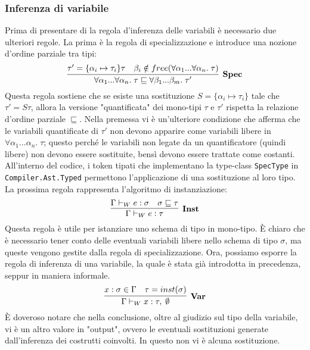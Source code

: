 \documentclass[10pt,a4paper]{article}
\begin{document}
\subsubsection{Inferenza di variabile}
Prima di presentare di la regola d'inferenza delle variabili è necessario due ulteriori regole. La prima è la
regola di specializzazione e introduce una nozione d'ordine parziale tra tipi:
\[ \infer[\textbf{Spec}]{\forall \alpha_1 ... \forall \alpha_n. \; \tau \sqsubseteq \forall \beta_1 ... \beta_m. \; \tau'}{\tau' = \{ \alpha_i \mapsto \tau_i \}\tau & \beta_i \notin free(\forall \alpha_1 ... \forall \alpha_n . \; \tau)} \]
Questa regola sostiene che se esiste una sostituzione $ S = \{ \alpha_i \mapsto \tau_i \} $ tale che $ \tau' = S \tau $,
allora la versione "quantificata" dei mono-tipi $ \tau $ e $ \tau' $ rispetta la relazione d'ordine parziale
$ \sqsubseteq $. Nella premessa vi è un'ulteriore condizione che afferma che le variabili quantificate di $ \tau' $
non devono apparire come variabili libere in $ \forall \alpha_1 ... \alpha_n. \; \tau $; questo perché le variabili
non legate da un quantificatore (quindi libere) non devono essere sostituite, bensì devono essere trattate come costanti.
All'interno del codice, i token tipati che implementano la type-class \texttt{SpecType} in \texttt{Compiler.Ast.Typed}
permettono l'applicazione di una sostituzione al loro tipo.
La prossima regola rappresenta l'algoritmo di instanziazione:
\[ \infer[\textbf{Inst}]{\Gamma \vdash_W e : \tau}{\Gamma \vdash_W e : \sigma & \sigma \sqsubseteq \tau} \]
Questa regola è utile per istanziare uno schema di tipo in mono-tipo. \`E chiaro che è necessario tener conto delle
eventuali variabili libere nello schema di tipo $ \sigma $, ma queste vengono gestite dalla regola di specializzazione.
Ora, possiamo esporre la regola di inferenza di una variabile, la quale è stata già introdotta in precedenza, seppur
in maniera informale.
\[ \infer[\textbf{Var}]{\Gamma \vdash_W x : \tau, \; \emptyset}{x : \sigma \in \Gamma & \tau = inst(\sigma)} \]
\`E doveroso notare che nella conclusione, oltre al giudizio sul tipo della variabile, vi è un altro valore in "output",
ovvero le eventuali sostituzioni generate dall'inferenza dei costrutti coinvolti. In questo non vi è alcuna sostituzione.
\end{document}

